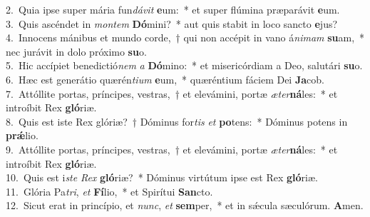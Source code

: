 {2.~}Quia ipse super mária fun\textit{dá}\textit{vit} \textbf{e}um:~* et super flúmina præparávit \textbf{e}um.\\
{3.~}Quis ascéndet in \textit{mon}\textit{tem} \textbf{Dó}mini?~* aut quis stabit in loco sancto \textbf{e}jus?\\
{4.~}Innocens mánibus et mundo corde,~† qui non accépit in vano á\textit{ni}\textit{mam} \textbf{su}am,~* nec jurávit in dolo próximo \textbf{su}o.\\
{5.~}Hic accípiet benedictió\textit{nem} \textit{a} \textbf{Dó}mino:~* et misericórdiam a Deo, salutári \textbf{su}o.\\
{6.~}Hæc est generátio quærén\textit{ti}\textit{um} \textbf{e}um,~* quæréntium fáciem Dei \textbf{Ja}cob.\\
{7.~}Attóllite portas, príncipes, vestras,~† et elevámini, portæ \textit{æ}\textit{ter}\textbf{ná}les:~* et introíbit Rex \textbf{gló}riæ.\\
{8.~}Quis est iste Rex glóriæ?~† Dóminus for\textit{tis} \textit{et} \textbf{po}tens:~* Dóminus potens in \textbf{prǽ}lio.\\
{9.~}Attóllite portas, príncipes, vestras,~† et elevámini, portæ \textit{æ}\textit{ter}\textbf{ná}les:~* et introíbit Rex \textbf{gló}riæ.\\
{10.~}Quis est i\textit{ste} \textit{Rex} \textbf{gló}riæ?~* Dóminus virtútum ipse est Rex \textbf{gló}riæ.\\
{11.~}Glória Pa\textit{tri}, \textit{et} \textbf{Fí}lio,~* et Spirítui \textbf{San}cto.\\
{12.~}Sicut erat in princípio, et \textit{nunc}, \textit{et} \textbf{sem}per,~* et in sǽcula sæculórum. \textbf{A}men.\\

